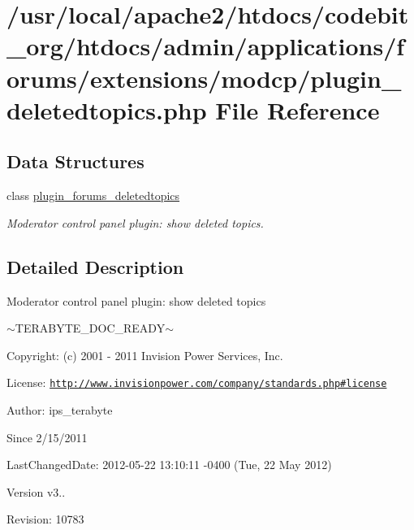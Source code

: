\hypertarget{plugin__deletedtopics_8php}{\section{/usr/local/apache2/htdocs/codebit\-\_\-org/htdocs/admin/applications/forums/extensions/modcp/plugin\-\_\-deletedtopics.php File Reference}
\label{plugin__deletedtopics_8php}
}
\subsection*{Data Structures}
\begin{DoxyCompactItemize}
\item 
class \hyperlink{classplugin__forums__deletedtopics}{plugin\-\_\-forums\-\_\-deletedtopics}
\begin{DoxyCompactList}\small\item\em Moderator control panel plugin\-: show deleted topics. \end{DoxyCompactList}\end{DoxyCompactItemize}


\subsection{Detailed Description}
\begin{DoxyVerb}  Moderator control panel plugin: show deleted topics
\end{DoxyVerb}
 $\sim$\-T\-E\-R\-A\-B\-Y\-T\-E\-\_\-\-D\-O\-C\-\_\-\-R\-E\-A\-D\-Y$\sim$ \begin{DoxyParagraph}{Copyright\-:}
(c) 2001 -\/ 2011 Invision Power Services, Inc.
\end{DoxyParagraph}
\begin{DoxyParagraph}{License\-:}
\href{http://www.invisionpower.com/company/standards.php#license}{\tt http\-://www.\-invisionpower.\-com/company/standards.\-php\#license}
\end{DoxyParagraph}
\begin{DoxyParagraph}{Author\-:}
ips\-\_\-terabyte 
\end{DoxyParagraph}
\begin{DoxySince}{Since}
2/15/2011 
\end{DoxySince}
\begin{DoxyParagraph}{Last\-Changed\-Date\-:}
2012-\/05-\/22 13\-:10\-:11 -\/0400 (Tue, 22 May 2012) 
\end{DoxyParagraph}
\begin{DoxyVersion}{Version}
v3.. 
\end{DoxyVersion}
\begin{DoxyParagraph}{Revision\-:}
10783 
\end{DoxyParagraph}
